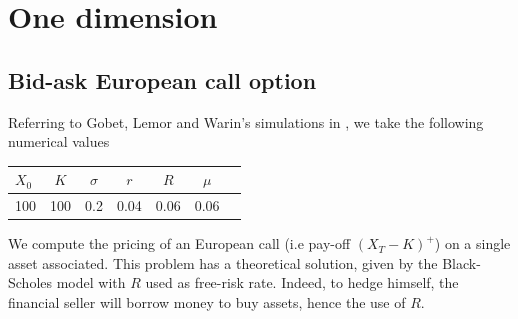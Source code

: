 \documentclass[english,11pt,openany]{report}
\theoremstyle{definition}
\theoremstyle{plain}
\theoremstyle{definition}
\begin{document}
\section{One dimension}

\subsection{Bid-ask European call option} 

Referring to Gobet, Lemor and Warin's simulations in \cite{gobet:example}, we take the following numerical values 

\begin{table}[H]
	\centering
	\begin{tabular}{ |l|c|c|c|c|c|c|}\hline
		$X_0$ & $K$ & $\sigma$ & $r$ & $R$ & $\mu$ \\ \hline
		100   & 100  & 0.2 & 0.04 & 0.06 & 0.06      \\ \hline
		
	\end{tabular}
\end{table}

We compute the pricing of an European call (i.e pay-off $(X_T - K)^+$) on a single asset associated. This problem has a theoretical solution, given by the Black-Scholes model with $R$ used as free-risk rate. 
Indeed, to hedge himself, the financial seller will borrow money to buy assets, hence the use of $R$. 
\end{document}
